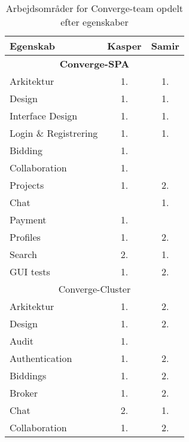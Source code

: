 \newpage
\begin{table}[H]
  \centering
  \caption{Arbejdsområder for Converge-team opdelt efter egenskaber}
  \label{tab:distribution-of-work}
  \begin{tabular}{lcc}
    \hline
    \textbf{Egenskab}      & \textbf{Kasper} & \textbf{Samir} \\ \hline
    \multicolumn{3}{c}{\textbf{Converge-SPA}}                 \\ \hline
    Arkitektur             & 1.              & 1.             \\
    Design                 & 1.              & 1.             \\
    Interface Design       & 1.              & 1.             \\
    Login \& Registrering  & 1.              & 1.             \\
    Bidding                & 1.              &                \\
    Collaboration          & 1.              &                \\
    Projects               & 1.              & 2.             \\
    Chat                   &                 & 1.             \\
    Payment                & 1.              &                \\
    Profiles               & 1.              & 2.             \\
    Search                 & 2.              & 1.             \\
    GUI tests              & 1.              & 2.             \\ \hline
    \multicolumn{3}{c}{Converge-Cluster}                      \\ \hline
    Arkitektur             & 1.              & 2.             \\
    Design                 & 1.              & 2.             \\
    Audit                  & 1.              &                \\
    Authentication         & 1.              & 2.             \\
    Biddings               & 1.              & 2.             \\
    Broker                 & 1.              & 2.             \\
    Chat                   & 2.              & 1.             \\
    Collaboration          & 1.              & 2.             \\

\end{tabular}
\end{table}
